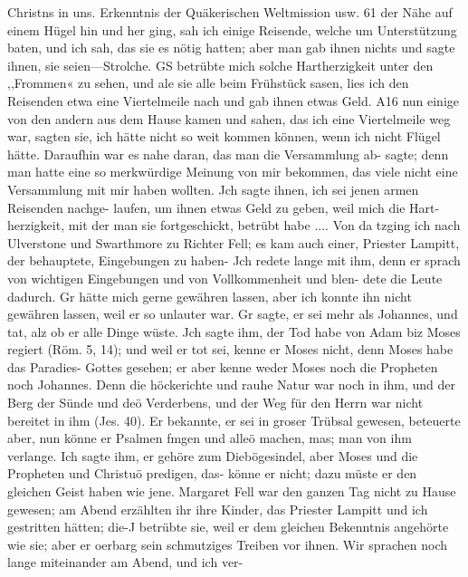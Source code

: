 Christns in uns. Erkenntnis der Quäkerischen Weltmission usw. 61
der Nähe auf einem Hügel hin und her ging, sah ich einige
Reisende, welche um Unterstützung baten, und ich sah, das sie
es nötig hatten; aber man gab ihnen nichts und sagte ihnen, sie
seien—Strolche. GS betrübte mich solche Hartherzigkeit unter den
,,Frommen« zu sehen, und ale sie alle beim Frühstück sasen, lies
ich den Reisenden etwa eine Viertelmeile nach und gab ihnen
etwas Geld. A16 nun einige von den andern aus dem Hause
kamen und sahen, das ich eine Viertelmeile weg war, sagten sie, ich
hätte nicht so weit kommen können, wenn ich nicht Flügel hätte.
Daraufhin war es nahe daran, das man die Versammlung ab-
sagte; denn man hatte eine so merkwürdige Meinung von mir
bekommen, das viele nicht eine Versammlung mit mir haben
wollten. Jch sagte ihnen, ich sei jenen armen Reisenden nachge-
laufen, um ihnen etwas Geld zu geben, weil mich die Hart-
herzigkeit, mit der man sie fortgeschickt, betrübt habe ....
Von da tzging ich nach Ulverstone und Swarthmore zu
Richter Fell; es kam auch einer, Priester Lampitt, der behauptete,
Eingebungen zu haben- Jch redete lange mit ihm, denn er sprach
von wichtigen Eingebungen und von Vollkommenheit und blen-
dete die Leute dadurch. Gr hätte mich gerne gewähren lassen,
aber ich konnte ihn nicht gewähren lassen, weil er so unlauter
war. Gr sagte, er sei mehr als Johannes, und tat, alz ob er
alle Dinge wüste. Jch sagte ihm, der Tod habe von Adam biz
Moses regiert (Röm. 5, 14); und weil er tot sei, kenne er Moses
nicht, denn Moses habe das Paradies- Gottes gesehen; er aber
kenne weder Moses noch die Propheten noch Johannes. Denn
die höckerichte und rauhe Natur war noch in ihm, und der Berg
der Sünde und deö Verderbens, und der Weg für den Herrn
war nicht bereitet in ihm (Jes. 40). Er bekannte, er sei in groser
Trübsal gewesen, beteuerte aber, nun könne er Psalmen fmgen
und alleö machen, mas; man von ihm verlange. Ich sagte ihm,
er gehöre zum Diebögesindel, aber Moses und die Propheten
und Christuö predigen, das- könne er nicht; dazu müste er den
gleichen Geist haben wie jene. Margaret Fell war den ganzen
Tag nicht zu Hause gewesen; am Abend erzählten ihr ihre Kinder,
das Priester Lampitt und ich gestritten hätten; die-J betrübte sie,
weil er dem gleichen Bekenntnis angehörte wie sie; aber er
oerbarg sein schmutziges Treiben vor ihnen.
Wir sprachen noch lange miteinander am Abend, und ich ver-


